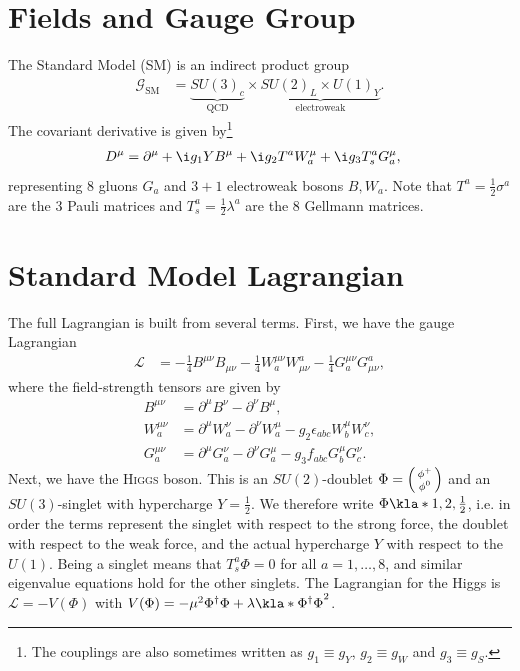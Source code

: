 \documentclass[english, parskip=full]{scrbook}
\begin{document}
\section{Fields and Gauge Group}
The Standard Model (SM) is an indirect product group
\begin{align}
\mathcal{G}_\text{SM} &= \underbrace{SU(3)_c}_\text{QCD} \times \underbrace{SU(2)_L \times U(1)_Y}_\text{electroweak}.
\end{align}
The covariant derivative is given by\footnote{The couplings are also sometimes written as $g_1\equiv g_Y$, $g_2\equiv g_W$ and $g_3\equiv g_S$.}
\begin{align}
D^\mu &= \partial^\mu + \i g_1YB^\mu + \i g_2 T^a W_a^\mu + \i g_3 T_s^a G_a^\mu,
\end{align}
representing 8 gluons $G_a$ and $3+1$ electroweak bosons $B,W_a$.
Note that $T^a=\frac{1}{2}\sigma^a$ are the 3 Pauli matrices and $T_s^a=\frac{1}{2}\lambda^a$ are the 8 Gellmann matrices.
\section{Standard Model Lagrangian}
The full Lagrangian is built from several terms.
First, we have the gauge Lagrangian
\begin{align}
\mathcal{L} &= -\frac{1}{4} B^{\mu\nu} B_{\mu\nu} - \frac{1}{4} W_a^{\mu\nu} W^a_{\mu\nu} - \frac{1}{4} G_a^{\mu\nu} G^a_{\mu\nu},
\end{align}
where the field-strength tensors are given by
\begin{align}
B^{\mu\nu} &= \partial^\mu B^\nu - \partial^\nu B^\mu,\\
W_a^{\mu\nu} &= \partial^\mu W_a^\nu - \partial^\nu W_a^\mu - g_2\epsilon_{abc} W_b^\mu W_c^\nu,\\
G_a^{\mu\nu} &= \partial^\mu G_a^\nu - \partial^\nu G_a^\mu - g_3 f_{abc} G_b^\mu G_c^\nu.
\end{align}
Next, we have the \textsc{Higgs} boson.
This is an $SU(2)$-doublet $\Phi=\begin{psmallmatrix} \phi^+ \\ \phi^0 \end{psmallmatrix}$ and an $SU(3)$-singlet with hypercharge $Y=\frac{1}{2}$.
We therefore write $\Phi\kla*{1,2,\frac{1}{2}}$, i.e. in order the terms represent the singlet with respect to the strong force, the doublet with respect to the weak force, and the actual hypercharge $Y$ with respect to the $U(1)$.
Being a singlet means that $T_s^a\Phi=0$ for all $a=1,\dots,8$, and similar eigenvalue equations hold for the other singlets.
The Lagrangian for the Higgs is $\mathcal{L}=-V(\Phi)$ with $V(\Phi)=-\mu^2\Phi^\dagger \Phi + \lambda \kla*{\Phi^\dagger\Phi}^2$.
\end{document}
